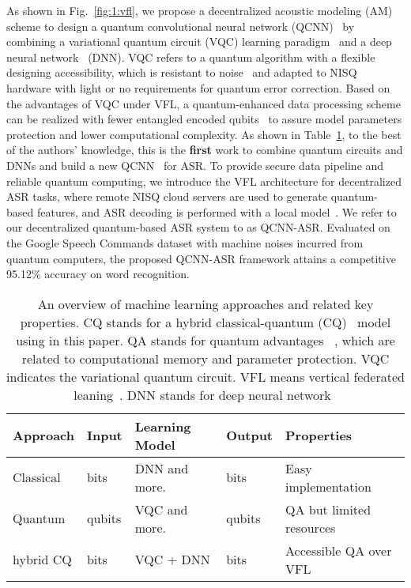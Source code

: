 \documentclass{article}
\begin{document}
As shown in Fig.~\ref{fig:1:vfl}, we propose a decentralized acoustic modeling (AM) scheme to design a quantum convolutional neural network (QCNN)~\cite{henderson2020quanvolutional} by combining a variational quantum circuit (VQC) learning paradigm~\cite{mitarai2018quantum} and a deep neural network~\cite{hochreiter1997long} (DNN). VQC refers to a quantum algorithm with a flexible designing accessibility, which is resistant to noise~\cite{mitarai2018quantum,havlivcek2019supervised} and adapted to NISQ hardware with light or no requirements for quantum error correction. Based on the advantages of VQC under VFL, a quantum-enhanced data processing scheme can be realized with fewer entangled encoded qubits~\cite{biamonte2017quantum, bergholm2018pennylane} to assure model parameters protection and lower computational complexity. As shown in Table~\ref{tab:overview}, to the best of the authors' knowledge, this is the \textbf{first} work to combine quantum circuits and DNNs and build a new QCNN~\cite{henderson2020quanvolutional} for ASR. To 
provide secure data pipeline and reliable quantum computing, we introduce the VFL architecture for decentralized ASR tasks, where remote NISQ cloud servers are used to generate quantum-based features, and ASR decoding is performed with a local model~\cite{yang2020multi}. We refer to our decentralized quantum-based ASR system to as QCNN-ASR. Evaluated on the Google Speech Commands dataset with machine noises incurred from quantum computers, the proposed QCNN-ASR framework attains a competitive 95.12\% accuracy on word recognition.
\begin{table}[t]\footnotesize
\centering
\vspace{-2mm}
\caption{An overview of machine learning  approaches and related key properties. CQ stands for a hybrid classical-quantum (CQ)~\cite{biamonte2017quantum} model using in this paper. QA stands for quantum advantages ~\cite{havlivcek2019supervised}, which are related to computational memory and parameter protection. VQC indicates the variational quantum circuit. VFL means vertical federated leaning~\cite{yang2019federated}. DNN stands for deep neural network~\cite{deng2013new}}
\label{tab:overview}
\begin{adjustbox}{width=0.48\textwidth}
\begin{tabular}{|l|l|l|l|l|}
\hline
Approach & Input & Learning Model & Output & Properties \\ \hline
Classical & bits & DNN and more. & bits & Easy implementation \\ \hline
Quantum & qubits & VQC and more. & qubits & QA but limited resources\\ \hline
hybrid CQ & bits & VQC + DNN & bits & Accessible QA over VFL \\ \hline
\end{tabular}
\end{adjustbox}
\vspace{-4mm}
\end{table}
\end{document}
